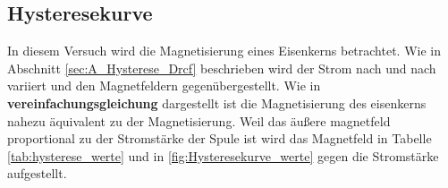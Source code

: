 \subsection{Hysteresekurve}
In diesem Versuch wird die Magnetisierung eines Eisenkerns betrachtet.
Wie in Abschnitt \ref{sec:A_Hysterese_Drcf} beschrieben wird der Strom nach und nach variiert 
und den Magnetfeldern gegenübergestellt.
Wie in \textbf{vereinfachungsgleichung} dargestellt ist die Magnetisierung des eisenkerns nahezu äquivalent zu der Magnetisierung.
Weil das äußere magnetfeld proportional zu der Stromstärke der Spule ist wird das Magnetfeld in Tabelle \ref{tab:hysterese_werte}
und in \ref{fig:Hysteresekurve_werte} gegen die Stromstärke aufgestellt.







